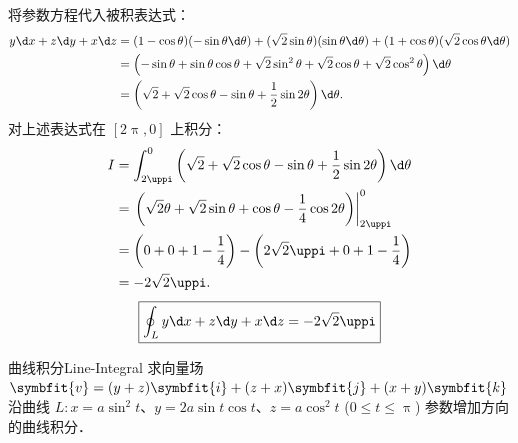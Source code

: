 \begin{solution}
    将参数方程代入被积表达式：
    \begin{equation}
        \begin{aligned}
            y \d x + z \d y + x \d z & = (1 - \cos \theta)(-\sin \theta \d \theta) + (\sqrt{2} \sin \theta)(\sin \theta \d \theta) + (1 + \cos \theta)(\sqrt{2} \cos \theta \d \theta) \\
                                     & = \left( -\sin \theta + \sin \theta \cos \theta + \sqrt{2} \sin^2 \theta + \sqrt{2} \cos \theta + \sqrt{2} \cos^2 \theta \right) \d \theta      \\
                                     & = \left( \sqrt{2} + \sqrt{2} \cos \theta - \sin \theta + \frac{1}{2} \sin 2\theta \right) \d \theta.
        \end{aligned}
    \end{equation}
    对上述表达式在 $[2\uppi, 0]$ 上积分：
    \begin{equation}
        \begin{aligned}
            I & = \int_{2\uppi}^0 \left( \sqrt{2} + \sqrt{2} \cos \theta - \sin \theta + \frac{1}{2} \sin 2\theta \right) \d \theta       \\
              & = \left. \left( \sqrt{2}\theta + \sqrt{2} \sin \theta + \cos \theta - \frac{1}{4} \cos 2\theta \right) \right|_{2\uppi}^0 \\
              & = \left( 0 + 0 + 1 - \frac{1}{4} \right) - \left( 2\sqrt{2}\uppi + 0 + 1 - \frac{1}{4} \right)                            \\
              & = -2\sqrt{2}\uppi.
        \end{aligned}
    \end{equation}
    \begin{equation}
        \boxed{\oint_L y \d x + z \d y + x \d z = -2\sqrt{2}\uppi}
    \end{equation}
\end{solution}

\begin{problem}{曲线积分}{Line-Integral}
    求向量场 $\symbfit{v} = (y + z)\symbfit{i} + (z + x)\symbfit{j} + (x + y)\symbfit{k}$ 沿曲线 $L: x = a \sin^2 t$、$y = 2a \sin t \cos t$、$z = a \cos^2 t$ ($0 \le t \le \uppi$) 参数增加方向的曲线积分．
\end{problem}

